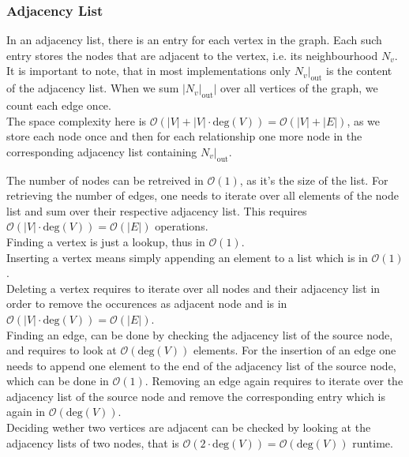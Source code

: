        \subsubsection*{Adjacency List}
        In an adjacency list, there is an entry for each vertex in the graph. 
        Each such entry stores the nodes that are adjacent to the vertex, i.e. its neighbourhood $N_v$. 
        It is important to note, that in most implementations only $N_v |_\text{out}$ is the content of the adjacency list.
        When we sum $|N_v |_\text{out}|$ over all vertices of the graph, we count each edge once. \\
        The space complexity here is $\mathcal{O}(|V| + |V| \cdot \text{deg}(V)) = \mathcal{O}(|V| + |E|)$, as we store each node once and then for each relationship one more node in the corresponding adjacency list containing $N_v |_\text{out}$.

        The number of nodes can be retreived in $\mathcal{O}(1)$, as it's the size of the list.
        For retrieving the number of edges, one needs to iterate over all elements of the node list and sum over their respective adjacency list. This requires $\mathcal{O}(|V| \cdot \text{deg}(V)) = \mathcal{O}(|E|)$ operations. \\

        Finding a vertex is just a lookup, thus in $\mathcal{O}(1)$. \\
        Inserting a vertex means simply appending an element to a list which is in $\mathcal{O}(1)$. \\
        Deleting a vertex requires to iterate over all nodes and their adjacency list in order to remove the occurences as adjacent node and is in $\mathcal{O}(|V| \cdot \text{deg}(V)) = \mathcal{O}(|E|)$. \\
        
        Finding an edge, can be done by checking the adjacency list of the source node, and requires to look at $\mathcal{O}(\text{deg}(V))$ elements.
        For the insertion of an edge one needs to append one element to the end of the adjacency list of the source node, which can be done in $\mathcal{O}(1)$.
        Removing an edge again requires to iterate over the adjacency list of the source node and remove the corresponding entry which is again in $\mathcal{O}(\text{deg}(V))$. \\
        
        Deciding wether two vertices are adjacent can be checked by looking at the adjacency lists of two nodes, that is $\mathcal{O}(2 \cdot \text{deg}(V)) = \mathcal{O}(\text{deg}(V))$ runtime.\\
        
